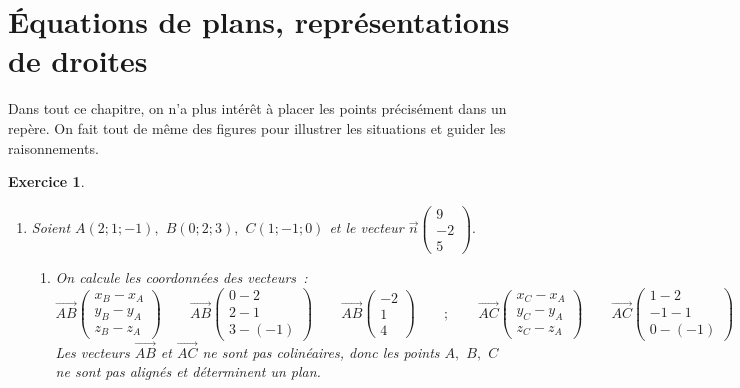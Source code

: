 \documentclass[10pt]{article}
\newtheorem{exo}{Exercice}
\begin{document}
\section{Équations de plans, représentations de droites}





Dans tout ce chapitre, on n'a plus intérêt à placer les points précisément dans un repère. On fait tout de même des figures pour illustrer les situations et guider les raisonnements.

\begin{exo}



\begin{enumerate}
\item Soient $A(2;1;-1),$ $B(0;2;3),$ $C(1;-1;0)$ et le vecteur $\overrightarrow{n}\begin{pmatrix}9\\-2\\5\end{pmatrix}.$
\begin{enumerate}
\item On calcule les coordonnées des vecteurs~:
\[\overrightarrow{AB}\begin{pmatrix} x_B-x_A\\y_B-y_A\\z_B-z_A\end{pmatrix}\qquad\overrightarrow{AB}\begin{pmatrix} 0-2\\2-1\\3-(-1)\end{pmatrix}\qquad\overrightarrow{AB}\begin{pmatrix} -2\\1\\4\end{pmatrix}\qquad;\qquad\overrightarrow{AC}\begin{pmatrix} x_C-x_A\\y_C-y_A\\z_C-z_A\end{pmatrix}\qquad\overrightarrow{AC}\begin{pmatrix} 1-2\\-1-1\\0-(-1)\end{pmatrix}\qquad\overrightarrow{AC}\begin{pmatrix} -1\\-2\\1\end{pmatrix}.\] Les vecteurs $\overrightarrow{AB}$ et $\overrightarrow{AC}$ ne sont pas colinéaires, donc les points $A,$ $B,$ $C$ ne sont pas alignés et déterminent un plan.


\end{enumerate}
\end{enumerate}
\end{exo}
\end{document}
